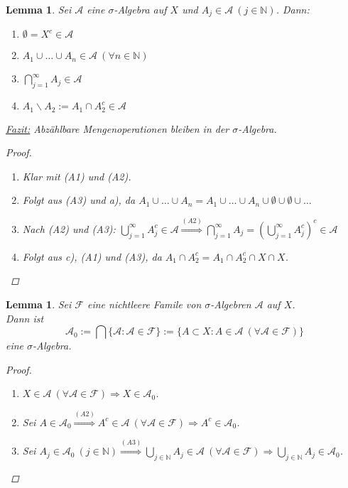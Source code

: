\documentclass[a4paper]{report}
\newcommand{\N}{\mathbb{N}}
\newcommand{\jlabel}[1]{\label{j_#1}}
\theoremstyle{plain}
\newtheorem{lem}[thm]{Lemma}
\theoremstyle{definition}
\begin{document}
\begin{lem}
\jlabel{Lem 1.3}
    Sei $\mathcal{A}$ eine $\sigma$-Algebra auf $X$ und $A_j \in \mathcal{A} \ (j \in \N)$. Dann:
    \begin{enumerate}
        \item $\emptyset = X^c \in \mathcal{A}$
        \item $A_1 \cup \dots \cup A_n \in \mathcal{A} \ (\forall n \in \N)$
        \item $\bigcap_{j=1}^\infty A_j \in \mathcal{A}$
        \item $A_1 \backslash A_2 := A_1 \cap A_2^c \in \mathcal{A}$
    \end{enumerate}
    \uline{Fazit:} Abzählbare Mengenoperationen bleiben in der $\sigma$-Algebra.
    \begin{proof}
        \begin{enumerate}
            \item Klar mit (A1) und (A2).
            \item Folgt aus (A3) und a), da $A_1 \cup \dots \cup A_n = A_1 \cup \dots \cup A_n \cup \emptyset \cup \emptyset \cup \dots$
            \item Nach (A2) und (A3): $\bigcup_{j=1}^\infty A_j^c \in \mathcal{A} \overset{(A2)}{\Rightarrow} \bigcap_{j=1}^\infty A_j = \left( \bigcup_{j=1}^\infty A_j^c \right)^c \in \mathcal{A}$
            \item Folgt aus c), (A1) und (A3), da $A_1 \cap A_2^c = A_1 \cap A_2^c \cap X \cap X$.
        \end{enumerate}

    \end{proof}
\end{lem}

\begin{lem}
\jlabel{Lem 1.4}
    Sei $\mathcal{F}$ eine nichtleere Famile von $\sigma$-Algebren $\mathcal{A}$ auf $X$.\\
    Dann ist 
    \begin{displaymath}
        \mathcal{A}_0 := \bigcap \{\mathcal{A} : \mathcal{A} \in \mathcal{F}\} := \{A \subset X: A \in \mathcal{A} \ (\forall \mathcal{A} \in \mathcal{F})\}
    \end{displaymath}
    eine $\sigma$-Algebra.
    \begin{proof}
        \begin{enumerate}
            \item[(A1)] $X \in \mathcal{A} \ (\forall \mathcal{A} \in \mathcal{F}) \Rightarrow X \in \mathcal{A}_0$.
            \item[(A2)] Sei $A \in \mathcal{A}_0 \overset{(A2)}{\Rightarrow} A^c \in \mathcal{A} \ (\forall \mathcal{A} \in \mathcal{F}) \Rightarrow A^c \in \mathcal{A}_0$.
            \item[(A3)] Sei $ A_j \in \mathcal{A}_0 \ (j\in\N) \overset{(A3)}{\Rightarrow} \bigcup_{j\in\N} A_j \in \mathcal{A} \ (\forall \mathcal{A} \in \mathcal{F}) \Rightarrow \bigcup_{j\in\N} A_j \in \mathcal{A}_0$.
        \end{enumerate}
    \end{proof}
\end{lem}
\end{document}
